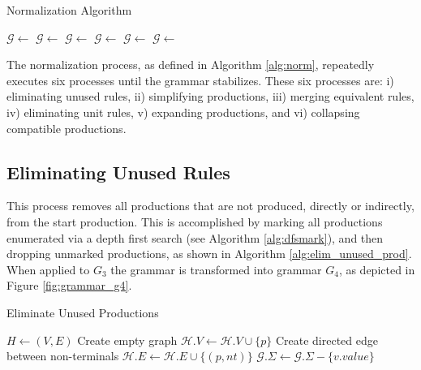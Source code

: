 \documentclass[10pt,nocc]{xrese_report}
\begin{document}
\begin{algorithm}[tb]
 \caption{Normalization Algorithm}\label{alg:norm}
 
 \begin{algorithmic}[1]
   \Repeat
     \State $\mathcal{G} \gets$ 
     \State $\mathcal{G} \gets$ 
     \State $\mathcal{G} \gets$ 
     \State $\mathcal{G} \gets$ 
     \State $\mathcal{G} \gets$ 
     \State $\mathcal{G} \gets$ 
  \EndProcedure
 \end{algorithmic}
\end{algorithm}

The normalization process, as defined in Algorithm \ref{alg:norm}, repeatedly executes six processes until the grammar stabilizes. These six processes are: i) eliminating unused rules, ii) simplifying productions, iii) merging equivalent rules, iv) eliminating unit rules, v) expanding productions, and vi) collapsing compatible productions.

\subsection{Eliminating Unused Rules}

This process removes all productions that are not produced, directly or indirectly, from the start production. This is accomplished by marking all productions enumerated via a depth first search (see Algorithm \ref{alg:dfsmark}), and then dropping unmarked productions, as shown in Algorithm \ref{alg:elim_unused_prod}. When applied to $G_3$ the grammar is transformed into grammar $G_4$, as depicted in Figure \ref{fig:grammar_g4}.

\begin{algorithm}[tb]
\caption{Eliminate Unused Productions}\label{alg:elim_unused_prod}
 \begin{algorithmic}[1]
    \State $H \gets (V,E)$ \LineComment Create empty graph
      \State $\mathcal{H}.V \gets \mathcal{H}.V \cup \{p\}$
    \EndFor
       \LineComment Create directed edge between non-terminals
        \State $\mathcal{H}.E \gets \mathcal{H}.E \cup \{(p, nt)\}$
      \EndFor
    \EndFor
    \State {}
        \State $\mathcal{G}.\Sigma \gets \mathcal{G}.\Sigma - \{v.value\}$
      \EndIf
    \EndFor
  \EndFunction
 \end{algorithmic}
\end{algorithm}
\end{document}
